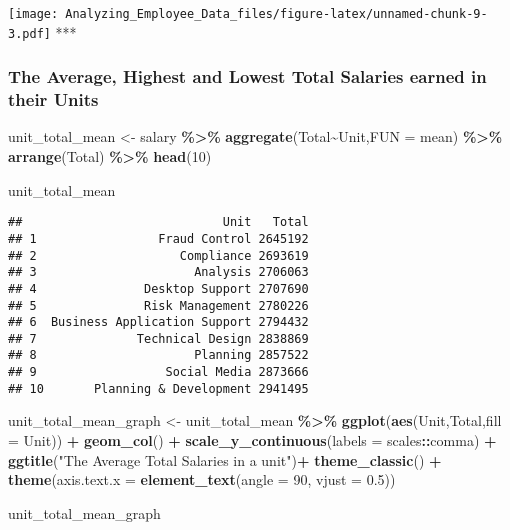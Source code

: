 \documentclass[
]{article}
\newenvironment{Shaded}{\begin{snugshade}}{\end{snugshade}}
\newcommand{\AttributeTok}[1]{\textcolor[rgb]{0.13,0.29,0.53}{#1}}
\newcommand{\DecValTok}[1]{\textcolor[rgb]{0.00,0.00,0.81}{#1}}
\newcommand{\FloatTok}[1]{\textcolor[rgb]{0.00,0.00,0.81}{#1}}
\newcommand{\FunctionTok}[1]{\textcolor[rgb]{0.13,0.29,0.53}{\textbf{#1}}}
\newcommand{\NormalTok}[1]{#1}
\newcommand{\OtherTok}[1]{\textcolor[rgb]{0.56,0.35,0.01}{#1}}
\newcommand{\SpecialCharTok}[1]{\textcolor[rgb]{0.81,0.36,0.00}{\textbf{#1}}}
\newcommand{\StringTok}[1]{\textcolor[rgb]{0.31,0.60,0.02}{#1}}
\begin{document}
\texttt{[image: Analyzing\_Employee\_Data\_files/figure-latex/unnamed-chunk-9-3.pdf]}
***

\subsubsection{The Average, Highest and Lowest Total Salaries earned in
their
Units}\label{the-average-highest-and-lowest-total-salaries-earned-in-their-units}

\begin{Shaded}
\begin{Highlighting}[]
\NormalTok{unit\_total\_mean }\OtherTok{\textless{}{-}}\NormalTok{ salary }\SpecialCharTok{\%\textgreater{}\%} 
  \FunctionTok{aggregate}\NormalTok{(Total}\SpecialCharTok{\textasciitilde{}}\NormalTok{Unit,}\AttributeTok{FUN =}\NormalTok{ mean) }\SpecialCharTok{\%\textgreater{}\%} 
  \FunctionTok{arrange}\NormalTok{(Total) }\SpecialCharTok{\%\textgreater{}\%} 
  \FunctionTok{head}\NormalTok{(}\DecValTok{10}\NormalTok{)}

\NormalTok{unit\_total\_mean}
\end{Highlighting}
\end{Shaded}

\begin{verbatim}
##                            Unit   Total
## 1                 Fraud Control 2645192
## 2                    Compliance 2693619
## 3                      Analysis 2706063
## 4               Desktop Support 2707690
## 5               Risk Management 2780226
## 6  Business Application Support 2794432
## 7              Technical Design 2838869
## 8                      Planning 2857522
## 9                  Social Media 2873666
## 10       Planning & Development 2941495
\end{verbatim}

\begin{Shaded}
\begin{Highlighting}[]
\NormalTok{unit\_total\_mean\_graph }\OtherTok{\textless{}{-}}\NormalTok{ unit\_total\_mean }\SpecialCharTok{\%\textgreater{}\%} 
  \FunctionTok{ggplot}\NormalTok{(}\FunctionTok{aes}\NormalTok{(Unit,Total,}\AttributeTok{fill =}\NormalTok{ Unit)) }\SpecialCharTok{+} 
  \FunctionTok{geom\_col}\NormalTok{() }\SpecialCharTok{+}
  \FunctionTok{scale\_y\_continuous}\NormalTok{(}\AttributeTok{labels =}\NormalTok{ scales}\SpecialCharTok{::}\NormalTok{comma) }\SpecialCharTok{+} 
  \FunctionTok{ggtitle}\NormalTok{(}\StringTok{"The Average Total Salaries in a unit"}\NormalTok{)}\SpecialCharTok{+}  
  \FunctionTok{theme\_classic}\NormalTok{() }\SpecialCharTok{+} \FunctionTok{theme}\NormalTok{(}\AttributeTok{axis.text.x =} \FunctionTok{element\_text}\NormalTok{(}\AttributeTok{angle =} \DecValTok{90}\NormalTok{, }\AttributeTok{vjust =} \FloatTok{0.5}\NormalTok{))}

\NormalTok{unit\_total\_mean\_graph}
\end{Highlighting}
\end{Shaded}
\end{document}
